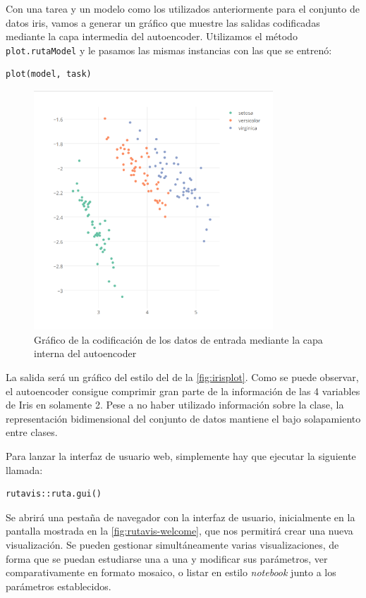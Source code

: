 \begin{example}
  Con una tarea y un modelo como los utilizados anteriormente para el conjunto de datos iris, vamos a generar un gráfico que muestre las salidas codificadas mediante la capa intermedia del autoencoder. Utilizamos el método \texttt{plot.rutaModel} y le pasamos las mismas instancias con las que se entrenó:
\begin{lstlisting}[numbers=none]
plot(model, task)
\end{lstlisting}
\begin{figure}[hbtp]
  \centering
  \includegraphics[width=0.8\textwidth]{images/rutavis_iris.png}
  \caption{\label{fig:irisplot}Gráfico de la codificación de los datos de entrada mediante la capa interna del autoencoder}
\end{figure}

La salida será un gráfico del estilo del de la \autoref{fig:irisplot}. 
Como se puede observar, el autoencoder consigue comprimir gran parte de la información de las 4 variables de Iris en solamente 2. Pese a no haber utilizado información sobre la clase, la representación bidimensional del conjunto de datos mantiene el bajo solapamiento entre clases.
\end{example}

Para lanzar la interfaz de usuario web, simplemente hay que ejecutar la siguiente llamada:
\begin{lstlisting}[numbers=none]
rutavis::ruta.gui()
\end{lstlisting}

Se abrirá una pestaña de navegador con la interfaz de usuario, inicialmente en la pantalla mostrada en la \autoref{fig:rutavis-welcome}, que nos permitirá crear una nueva visualización. Se pueden gestionar simultáneamente varias visualizaciones, de forma que se puedan estudiarse una a una y modificar sus parámetros, ver comparativamente en formato mosaico, o listar en estilo \emph{notebook} junto a los parámetros establecidos.

